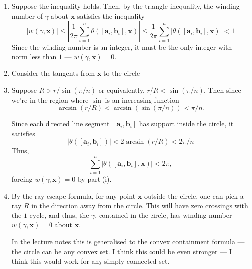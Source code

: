\documentclass[12 pt, letterpaper]{hmcpset}
\begin{document}
\begin{solution}
	\begin{enumerate}
		\item Suppose the inequality holds. Then, by the triangle inequality, the winding number of $\gamma$ about $\mathbf{x}$ satisfies the inequality
			\[
				\lvert w(\gamma, \mathbf{x}) \rvert \le \left \lvert \frac{1}{2 \pi} \sum_{i = 1}^{n} \theta([\mathbf{a}_{i}, \mathbf{b}_{i}], \mathbf{x}) \right \rvert \le \frac{1}{2 \pi} \sum_{i = 1}^{n} \lvert \theta([\mathbf{a}_{i}, \mathbf{b}_{i}], \mathbf{x}) \rvert < 1
			\]
			Since the winding number is an integer, it must be the only integer with norm less than $1$ --- $w(\gamma, \mathbf{x}) = 0$.
		\item Consider the tangents from $\mathbf{x}$ to the circle
		\item Suppose $R > r / \sin{(\pi / n)}$ or equivalently, $r / R < \sin{(\pi / n)}$. Then since we're in the region where $\sin$ is an increasing function
			\[
				\arcsin{(r / R)} < \arcsin{(\sin{(\pi / n)})} < \pi / n.
			\]

			Since each directed line segment $[\mathbf{a}_{i},  \mathbf{b}_{i}]$ has support inside the circle, it satisfies
			\[
				\lvert \theta([\mathbf{a}_{i}, \mathbf{b}_{i}]) \rvert < 2 \arcsin{(r / R)} < 2 \pi / n
			\]
			Thus,
			\[
				\sum_{i = 1}^{n} \lvert \theta([\mathbf{a}_{i}, \mathbf{b}_{i}], \mathbf{x}) \rvert < 2 \pi,
			\]
			forcing $w(\gamma, \mathbf{x}) = 0$ by part (i).
		\item By the ray escape formula, for any point $\mathbf{x}$ outside the circle, one can pick a ray $R$ in the direction away from the circle. This will have zero crossings with the $1$-cycle, and thus, the $\gamma$, contained in the circle, has winding number $w(\gamma, \mathbf{x}) = 0$ about $\mathbf{x}$.

			In the lecture notes this is generalised to the convex containment formula --- the circle can be any convex set. I think this could be even stronger --- I think this would work for any simply connected set.
	\end{enumerate}
\end{solution}

\pagebreak
\end{document}
